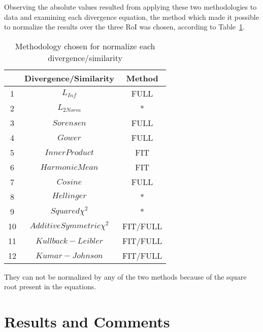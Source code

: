 \documentclass[conference]{IEEEtran}
\begin{document}
Observing the absolute values resulted from applying these two methodologies to data and examining each divergence equation, the method which made it possible to normalize the results over the three RoI was chosen, according to Table~\ref{tab09}.

\begin{table}[!h]
	\centering
	\caption{Methodology chosen for normalize each divergence/similarity}
	\label{tab09}
	\begin{tabular}{ccc}
    & Divergence/Similarity 											 & Method   \\ \hline
	1 & $L_{Inf}$                                                        & FULL     \\
	2 & $L_{2Norm}$                                                      & *        \\
	3 & $Sorensen$                                                       & FULL     \\
	4 & $Gower$                                                          & FULL     \\
	5 & $Inner Product$                                                  & FIT      \\
	6 & $Harmonic Mean$                                                  & FIT      \\
	7 & $Cosine$                                                         & FULL     \\
	8 & $Hellinger$                                                      & *        \\
	9 & $Squared \chi^2$                                                 & *        \\
	10 & $Additive Symmetric \chi^2$                                      & FIT/FULL \\
	11 & $Kullback-Leibler$                                               & FIT/FULL \\
	12 & $Kumar-Johnson$                                                  & FIT/FULL \\
	\hline
\end{tabular}

{\scriptsize * They can not be normalized by any of the two methods because of the square root present in the equations.}
\end{table}

\section{Results and Comments}\label{resultados}
\end{document}
